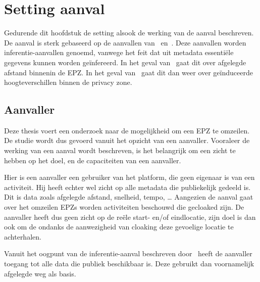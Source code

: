 
\chapter{Setting aanval}
Gedurende dit hoofdstuk de setting alsook de werking van de aanval beschreven.
De aanval is sterk gebaseerd op de aanvallen
van~\citeauthor{Dhondt_Pochat_Voulimeneas_Joosen_Volckaert_2022}\cite{Dhondt_Pochat_Voulimeneas_Joosen_Volckaert_2022}
en~\citeauthor{Verdonck_2022}\cite{Verdonck_2022}. Deze aanvallen worden
inferentie-aanvallen genoemd, vanwege het feit dat uit metadata essentiële
gegevens kunnen worden geïnfereerd. In het geval
van~\citeauthor{Dhondt_Pochat_Voulimeneas_Joosen_Volckaert_2022} gaat dit over
afgelegde afstand binnenin de \ac{EPZ}. In het geval
van~\citeauthor{Verdonck_2022} gaat dit dan weer over geïnduceerde
hoogteverschillen binnen de privacy zone.

\section{Aanvaller}
Deze thesis voert een onderzoek naar de mogelijkheid om een \ac{EPZ} te
omzeilen. De studie wordt dus gevoerd vanuit het opzicht van een aanvaller.
Vooraleer de werking van een aanval wordt beschreven, is het belangrijk om een
zicht te hebben op het doel, en de capaciteiten van een aanvaller.

Hier is een aanvaller een gebruiker van het platform, die geen eigenaar is van
een activiteit. Hij heeft echter wel zicht op alle metadata die publiekelijk
gedeeld is. Dit is data zoals afgelegde afstand, snelheid, tempo, \ldots
Aangezien de aanval gaat over het omzeilen \acp{EPZ} worden activiteiten
beschouwd die gecloaked zijn. De aanvaller heeft dus geen zicht op de reële
start- en/of eindlocatie, zijn doel is dan ook om de ondanks de aanwezigheid
van cloaking deze gevoelige locatie te achterhalen.

Vanuit het oogpunt van de inferentie-aanval beschreven
door~\citeauthor{Dhondt_Pochat_Voulimeneas_Joosen_Volckaert_2022} heeft de
aanvaller toegang tot alle data die publiek beschikbaar is. Deze gebruikt dan
voornamelijk afgelegde weg als basis.

